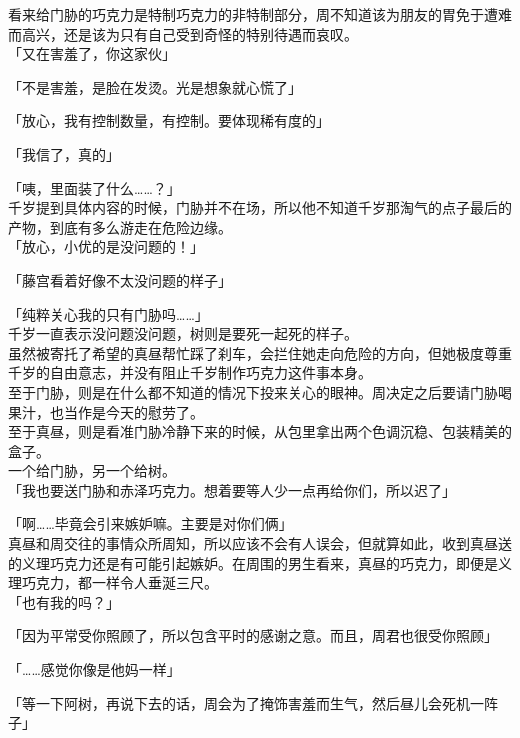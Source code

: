 看来给门胁的巧克力是特制巧克力的非特制部分，周不知道该为朋友的胃免于遭难而高兴，还是该为只有自己受到奇怪的特别待遇而哀叹。\\

「又在害羞了，你这家伙」

「不是害羞，是脸在发烫。光是想象就心慌了」

「放心，我有控制数量，有控制。要体现稀有度的」

「我信了，真的」

「咦，里面装了什么……？」\\

千岁提到具体内容的时候，门胁并不在场，所以他不知道千岁那淘气的点子最后的产物，到底有多么游走在危险边缘。\\

「放心，小优的是没问题的！」

「藤宫看着好像不太没问题的样子」

「纯粹关心我的只有门胁吗……」\\

千岁一直表示没问题没问题，树则是要死一起死的样子。\\

虽然被寄托了希望的真昼帮忙踩了刹车，会拦住她走向危险的方向，但她极度尊重千岁的自由意志，并没有阻止千岁制作巧克力这件事本身。\\

至于门胁，则是在什么都不知道的情况下投来关心的眼神。周决定之后要请门胁喝果汁，也当作是今天的慰劳了。\\

至于真昼，则是看准门胁冷静下来的时候，从包里拿出两个色调沉稳、包装精美的盒子。\\

一个给门胁，另一个给树。\\


「我也要送门胁和赤泽巧克力。想着要等人少一点再给你们，所以迟了」

「啊……毕竟会引来嫉妒嘛。主要是对你们俩」\\

真昼和周交往的事情众所周知，所以应该不会有人误会，但就算如此，收到真昼送的义理巧克力还是有可能引起嫉妒。在周围的男生看来，真昼的巧克力，即便是义理巧克力，都一样令人垂涎三尺。\\

「也有我的吗？」

「因为平常受你照顾了，所以包含平时的感谢之意。而且，周君也很受你照顾」

「……感觉你像是他妈一样」

「等一下阿树，再说下去的话，周会为了掩饰害羞而生气，然后昼儿会死机一阵子」

